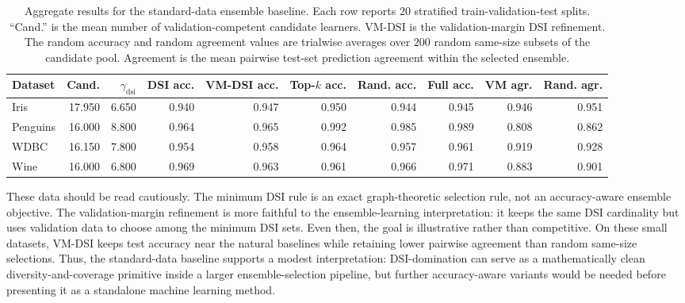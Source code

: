 \documentclass[11pt]{article}
\theoremstyle{definition}
\theoremstyle{remark}
\newcommand{\dsi}{\mathrm{dsi}}
\begin{document}
\begin{table}[H]
\centering
\scriptsize
\begin{tabular}{lrrrrrrrrr}
\hline
Dataset & Cand. & \(\gamma_{\dsi}\) & DSI acc. & VM-DSI acc. &
Top-\(k\) acc. & Rand. acc. & Full acc. & VM agr. & Rand. agr. \\
\hline
Iris & 17.950 & 6.650 & 0.940 & 0.947 & 0.950 & 0.944 & 0.945 & 0.946 & 0.951 \\
Penguins & 16.000 & 8.800 & 0.964 & 0.965 & 0.992 & 0.985 & 0.989 & 0.808 & 0.862 \\
WDBC & 16.150 & 7.800 & 0.954 & 0.958 & 0.964 & 0.957 & 0.961 & 0.919 & 0.928 \\
Wine & 16.000 & 6.800 & 0.969 & 0.963 & 0.961 & 0.966 & 0.971 & 0.883 & 0.901 \\
\hline
\end{tabular}
\caption{Aggregate results for the standard-data ensemble baseline.
Each row reports \(20\) stratified train-validation-test splits. ``Cand.''
is the mean number of validation-competent candidate learners. VM-DSI is
the validation-margin DSI refinement. The random accuracy and random
agreement values are trialwise averages over \(200\) random same-size
subsets of the candidate pool. Agreement is the mean pairwise test-set
prediction agreement within the selected ensemble.}
\label{tab:real-data-ensemble-experiment}
\end{table}

These data should be read cautiously. The minimum DSI rule is an exact
graph-theoretic selection rule, not an accuracy-aware ensemble objective.
The validation-margin refinement is more faithful to the ensemble-learning
interpretation: it keeps the same DSI cardinality but uses validation data
to choose among the minimum DSI sets. Even then, the goal is illustrative
rather than competitive. On these small datasets, VM-DSI keeps test
accuracy near the natural baselines while retaining lower pairwise
agreement than random same-size selections. Thus, the standard-data baseline
supports a modest interpretation: DSI-domination can serve as a
mathematically clean diversity-and-coverage primitive inside a larger
ensemble-selection pipeline, but further accuracy-aware variants would be
needed before presenting it as a standalone machine learning method.
\end{document}
